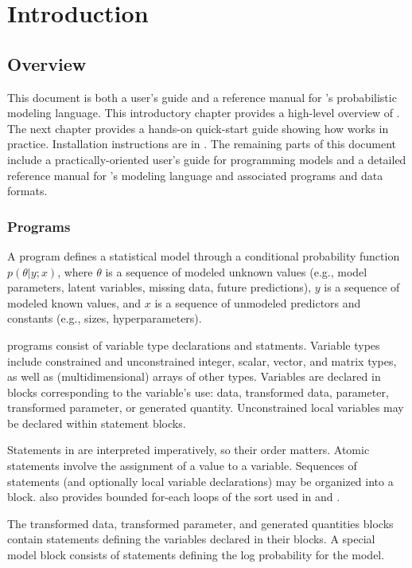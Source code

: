 \part{Introduction}


\chapter{Overview}

\noindent
This document is both a user's guide and a reference manual for
\Stan's probabilistic modeling language.  This introductory chapter
provides a high-level overview of \Stan.  The next chapter provides a
hands-on quick-start guide showing how \Stan works in practice.
Installation instructions are in . The remaining
parts of this document include a practically-oriented user's guide for
programming models and a detailed reference manual for \Stan's
modeling language and associated programs and data formats.

\section{\Stan Programs}

A \Stan program defines a statistical model through a conditional
probability function $p(\theta|y;x)$, where $\theta$ is a sequence of
modeled unknown values (e.g., model parameters, latent variables, missing
data, future predictions), $y$ is a sequence of modeled known 
values, and $x$ is a sequence of unmodeled predictors and constants
(e.g., sizes, hyperparameters).

\Stan programs consist of variable type declarations and statments.
Variable types include constrained and unconstrained integer, scalar,
vector, and matrix types, as well as (multidimensional) arrays of
other types.  Variables are declared in blocks corresponding to the
variable's use: data, transformed data, parameter, transformed
parameter, or generated quantity.  Unconstrained local variables may
be declared within statement blocks.

Statements in \Stan are interpreted imperatively, so their order
matters.  Atomic statements involve the assignment of a value to a
variable.  Sequences of statements (and optionally local variable
declarations) may be organized into a block.  \Stan also provides bounded
for-each loops of the sort used in \R and \BUGS.

The transformed data, transformed parameter, and generated quantities
blocks contain statements defining the variables declared in their
blocks.  A special model block consists of statements defining the log
probability for the model.

